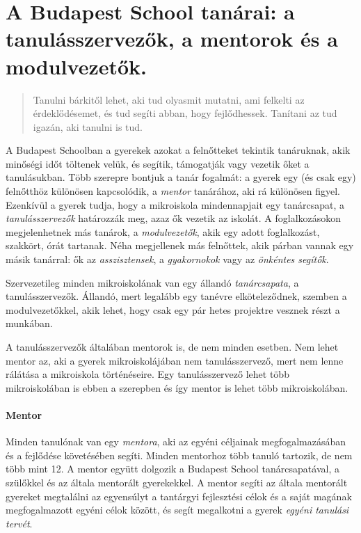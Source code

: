   \section{A Budapest School tanárai: a tanulásszervezők, a mentorok és a modulvezetők.}
  \label{sec:tanarok}
  \begin{quote}

    Tanulni bárkitől lehet, aki tud olyasmit mutatni, ami felkelti az
    érdeklődésemet, és tud segíti abban, hogy fejlődhessek. Tanítani az tud igazán, aki tanulni is tud.
\end{quote}
A Budapest Schoolban a gyerekek azokat a felnőtteket tekintik tanáruknak, akik minőségi időt töltenek velük, és segítik, támogatják vagy vezetik őket a tanulásukban. Több szerepre bontjuk a tanár fogalmát: a gyerek egy (és csak egy) felnőtthöz különösen kapcsolódik, a \emph{mentor} tanárához, aki rá különösen figyel. Ezenkívül a gyerek tudja, hogy a mikroiskola mindennapjait egy tanárcsapat, a \emph{tanulásszervezők} határozzák meg, azaz ők vezetik az iskolát.  A foglalkozásokon megjelenhetnek más tanárok, a \emph{modulvezetők}, akik egy adott foglalkozást, szakkört, órát tartanak. Néha megjellenek más felnőttek, akik párban vannak egy másik tanárral: ők az \emph{asszisztensek}, a \emph{gyakornokok} vagy az \emph{önkéntes segítők}.

Szervezetileg minden mikroiskolának van egy állandó \emph{tanárcsapata}, a tanulásszervezők. Állandó, mert legalább egy tanévre elköteleződnek, szemben a modulvezetőkkel, akik lehet, hogy csak egy pár hetes projektre vesznek részt a munkában.

A tanulásszervezők általában mentorok is, de nem minden esetben. Nem lehet mentor az, aki a gyerek mikroiskolájában nem tanulásszervező, mert nem lenne rálátása a mikroiskola történéseire. Egy tanulásszervező lehet több mikroiskolában is ebben a szerepben és így mentor is lehet több mikroiskolában.

\paragraph{Mentor}
  Minden tanulónak van egy \emph{mentora}, aki az egyéni céljainak megfogalmazásában és
  a fejlődése követésében segíti. Minden mentorhoz több tanuló tartozik, de nem
  több mint 12. A mentor együtt dolgozik a Budapest School tanárcsapatával, a
  szülőkkel és az általa mentorált gyerekekkel. A mentor segíti az általa
  mentorált gyereket megtalálni az egyensúlyt a tantárgyi fejlesztési célok és a
  saját magának megfogalmazott egyéni célok között, és segít megalkotni a gyerek \emph{egyéni
  tanulási tervét}.

